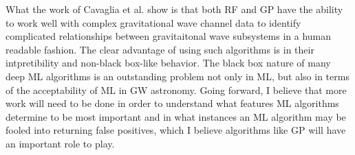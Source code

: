 %

What the work of Cavaglia et al. show is that both \ac{RF} and \ac{GP} have the ability to work well with complex gravitational wave channel data to identify complicated relationships between gravitaitonal wave subsystems in a human readable fashion. The clear advantage of using such algorithms is in their intpretibility and non-black box-like behavior. The black box nature of many deep \ac{ML} algorithms is an outstanding problem not only in \ac{ML}, but also in terms of the acceptability of \ac{ML} in \ac{GW} astronomy. Going forward, I believe that more work will need to be done in order to understand what features \ac{ML} algorithms determine to be most important and in what instances an \ac{ML} algorithm may be fooled into returning false positives, which I believe algorithms like \ac{GP} will have an important role to play.


